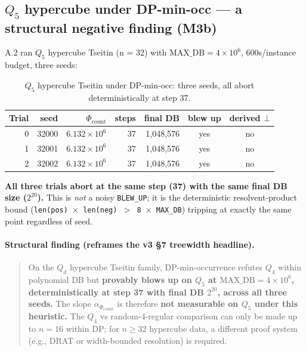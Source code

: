 \documentclass[11pt,a4paper]{article}
\theoremstyle{remark}
\begin{document}
\subsection{$Q_5$ hypercube under DP-min-occ --- a structural negative finding (M3b)}

A.2 ran $Q_5$ hypercube Tseitin (n = 32) with $\mathrm{MAX\_DB} = 4 \times
10^6$, 600s/instance budget, three seeds:

\begin{table}[H]
\centering
\small
\begin{tabular}{@{}rrrrrcc@{}}
\toprule
Trial & seed & $\Phi_{\mathrm{count}}$ & steps & final DB & blew up & derived $\bot$ \\
\midrule
0 & 32000 & $6.132{\times}10^6$ & 37 & 1{,}048{,}576 & yes & no \\
1 & 32001 & $6.132{\times}10^6$ & 37 & 1{,}048{,}576 & yes & no \\
2 & 32002 & $6.132{\times}10^6$ & 37 & 1{,}048{,}576 & yes & no \\
\bottomrule
\end{tabular}
\caption{$Q_5$ hypercube Tseitin under DP-min-occ: three seeds, all abort deterministically at step 37.}
\label{tab:q5}
\end{table}

\textbf{All three trials abort at the same step (37) with the same final
DB size ($2^{20}$).} This is \emph{not} a noisy \texttt{BLEW\_UP}; it is
the deterministic resolvent-product bound
(\texttt{len(pos) $\times$ len(neg) $>$ 8 $\times$ MAX\_DB}) tripping at
exactly the same point regardless of seed.

\paragraph{Structural finding (reframes the v3 \S7 treewidth headline).}

\begin{quote}
On the $Q_d$ hypercube Tseitin family, DP-min-occurrence refutes $Q_4$
within polynomial DB but \textbf{provably blows up on $Q_5$ at
$\mathrm{MAX\_DB} = 4 \times 10^6$, deterministically at step 37 with
final DB $2^{20}$, across all three seeds.} The slope
$\alpha_{\Phi_{\mathrm{count}}}$ is therefore \textbf{not measurable on
$Q_5$ under this heuristic.} The $Q_4$ vs random-4-regular comparison can
only be made up to $n=16$ within DP; for $n \ge 32$ hypercube data, a
different proof system (e.g., DRAT or width-bounded resolution) is required.
\end{quote}
\end{document}

